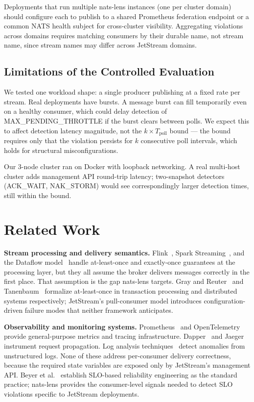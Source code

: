 \documentclass[journal]{IEEEtran}
\begin{document}
Deployments that run multiple nats-lens instances (one per cluster domain)
should configure each to publish to a shared Prometheus federation endpoint
or a common NATS health subject for cross-cluster visibility. Aggregating
violations across domains requires matching consumers by their durable name,
not stream name, since stream names may differ across JetStream domains.

\subsection{Limitations of the Controlled Evaluation}

We tested one workload shape: a single producer publishing at a fixed
rate per stream. Real deployments have bursts. A message burst can fill
 temporarily even on a healthy consumer, which could
delay detection of MAX\_PENDING\_THROTTLE if the burst clears between
polls. We expect this to affect detection latency magnitude, not the
$k \times T_\text{poll}$ bound --- the bound requires only that the
violation persists for $k$ consecutive poll intervals, which holds for
structural misconfigurations.

Our 3-node cluster ran on Docker with loopback networking. A real
multi-host cluster adds management API round-trip latency; two-snapshot
detectors (ACK\_WAIT, NAK\_STORM) would see correspondingly larger
detection times, still within the bound.

\section{Related Work}
\label{sec:related}

\textbf{Stream processing and delivery semantics.}
Flink~\cite{flink}, Spark Streaming~\cite{spark-streaming}, and the
Dataflow model~\cite{dataflow} handle at-least-once and exactly-once
guarantees at the processing layer, but they all assume the broker delivers
messages correctly in the first place. That assumption is the gap nats-lens
targets. Gray and Reuter~\cite{gray1992} and Tanenbaum~\cite{tanenbaum}
formalize at-least-once in transaction processing and distributed systems
respectively; JetStream's pull-consumer model introduces configuration-driven
failure modes that neither framework anticipates.

\textbf{Observability and monitoring systems.}
Prometheus~\cite{prometheus} and OpenTelemetry~\cite{opentelemetry} provide
general-purpose metrics and tracing infrastructure. Dapper~\cite{dapper}
and Jaeger~\cite{jaeger} instrument request propagation. Log analysis
techniques~\cite{logmining} detect anomalies from unstructured logs. None
of these address per-consumer delivery correctness, because the required
state variables are exposed only by JetStream's management API.
Beyer et al.~\cite{sre} establish SLO-based reliability engineering as
the standard practice; nats-lens provides the consumer-level signals
needed to detect SLO violations specific to JetStream deployments.
\end{document}
